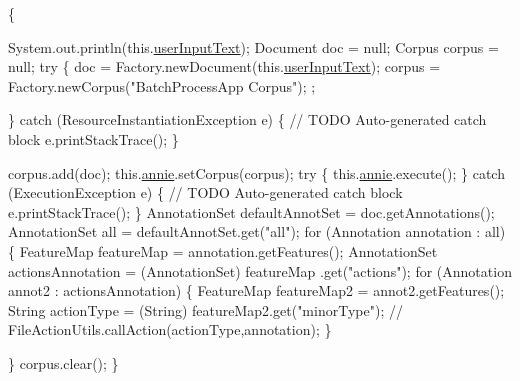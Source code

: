\begin{DoxyCode}
                      \{

        System.out.println(this.\hyperlink{classcom_1_1poly_1_1nlp_1_1filekommander_1_1_file_kommander_a499151b0f39dbce7b82a811c8cf21402}{userInputText});
        Document doc = null;
        Corpus corpus = null;
        \textcolor{keywordflow}{try} \{
            doc = Factory.newDocument(this.\hyperlink{classcom_1_1poly_1_1nlp_1_1filekommander_1_1_file_kommander_a499151b0f39dbce7b82a811c8cf21402}{userInputText});
            corpus = Factory.newCorpus(\textcolor{stringliteral}{"BatchProcessApp Corpus"});
            ;

        \} \textcolor{keywordflow}{catch} (ResourceInstantiationException e) \{
            \textcolor{comment}{// TODO Auto-generated catch block}
            e.printStackTrace();
        \}

        corpus.add(doc);
        this.\hyperlink{classcom_1_1poly_1_1nlp_1_1filekommander_1_1_file_kommander_a5c3ff51dc7f068e9442618b7c2ab1810}{annie}.setCorpus(corpus);
        \textcolor{keywordflow}{try} \{
            this.\hyperlink{classcom_1_1poly_1_1nlp_1_1filekommander_1_1_file_kommander_a5c3ff51dc7f068e9442618b7c2ab1810}{annie}.execute();
        \} \textcolor{keywordflow}{catch} (ExecutionException e) \{
            \textcolor{comment}{// TODO Auto-generated catch block}
            e.printStackTrace();
        \}
        AnnotationSet defaultAnnotSet = doc.getAnnotations();
        AnnotationSet all = defaultAnnotSet.get(\textcolor{stringliteral}{"all"});
        \textcolor{keywordflow}{for} (Annotation annotation : all) \{
            FeatureMap featureMap = annotation.getFeatures();
            AnnotationSet actionsAnnotation = (AnnotationSet) featureMap
                    .\textcolor{keyword}{get}(\textcolor{stringliteral}{"actions"});
            \textcolor{keywordflow}{for} (Annotation annot2 : actionsAnnotation) \{
                FeatureMap featureMap2 = annot2.getFeatures();
                String actionType = (String) featureMap2.get(\textcolor{stringliteral}{"minorType"});
                \textcolor{comment}{// FileActionUtils.callAction(actionType,annotation);}
            \}

        \}
        corpus.clear();
    \}
\end{DoxyCode}
